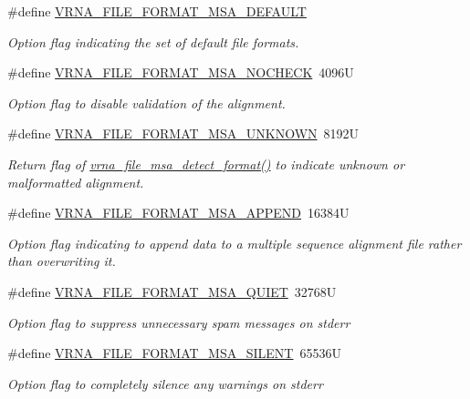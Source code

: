 \begin{DoxyCompactItemize}
\#define \mbox{\hyperlink{group__file__formats__msa_ga4acc255373831856a8417b68de8a94c0}{V\+R\+N\+A\+\_\+\+F\+I\+L\+E\+\_\+\+F\+O\+R\+M\+A\+T\+\_\+\+M\+S\+A\+\_\+\+D\+E\+F\+A\+U\+LT}}
\begin{DoxyCompactList}\small\item\em Option flag indicating the set of default file formats. \end{DoxyCompactList}\item 
\#define \mbox{\hyperlink{group__file__formats__msa_ga229fb3778ecabea4782902b69fa48fd1}{V\+R\+N\+A\+\_\+\+F\+I\+L\+E\+\_\+\+F\+O\+R\+M\+A\+T\+\_\+\+M\+S\+A\+\_\+\+N\+O\+C\+H\+E\+CK}}~4096U
\begin{DoxyCompactList}\small\item\em Option flag to disable validation of the alignment. \end{DoxyCompactList}\item 
\#define \mbox{\hyperlink{group__file__formats__msa_gabdc948f547e550125de3e7c65878400c}{V\+R\+N\+A\+\_\+\+F\+I\+L\+E\+\_\+\+F\+O\+R\+M\+A\+T\+\_\+\+M\+S\+A\+\_\+\+U\+N\+K\+N\+O\+WN}}~8192U
\begin{DoxyCompactList}\small\item\em Return flag of \mbox{\hyperlink{group__file__formats__msa_gade4fa8136ebb2d0f7eb3f8b59a8658e3}{vrna\+\_\+file\+\_\+msa\+\_\+detect\+\_\+format()}} to indicate unknown or malformatted alignment. \end{DoxyCompactList}\item 
\#define \mbox{\hyperlink{group__file__formats__msa_ga1577ea0f497d9c501549c863a4f2c089}{V\+R\+N\+A\+\_\+\+F\+I\+L\+E\+\_\+\+F\+O\+R\+M\+A\+T\+\_\+\+M\+S\+A\+\_\+\+A\+P\+P\+E\+ND}}~16384U
\begin{DoxyCompactList}\small\item\em Option flag indicating to append data to a multiple sequence alignment file rather than overwriting it. \end{DoxyCompactList}\item 
\#define \mbox{\hyperlink{group__file__formats__msa_ga73aa3701a22c5acfcb2e8927287a0554}{V\+R\+N\+A\+\_\+\+F\+I\+L\+E\+\_\+\+F\+O\+R\+M\+A\+T\+\_\+\+M\+S\+A\+\_\+\+Q\+U\+I\+ET}}~32768U
\begin{DoxyCompactList}\small\item\em Option flag to suppress unnecessary spam messages on {\ttfamily stderr} \end{DoxyCompactList}\item 
\#define \mbox{\hyperlink{group__file__formats__msa_gad98ca08968d19f221f29d2a1faf26887}{V\+R\+N\+A\+\_\+\+F\+I\+L\+E\+\_\+\+F\+O\+R\+M\+A\+T\+\_\+\+M\+S\+A\+\_\+\+S\+I\+L\+E\+NT}}~65536U
\begin{DoxyCompactList}\small\item\em Option flag to completely silence any warnings on {\ttfamily stderr} \end{DoxyCompactList}\end{DoxyCompactItemize}
